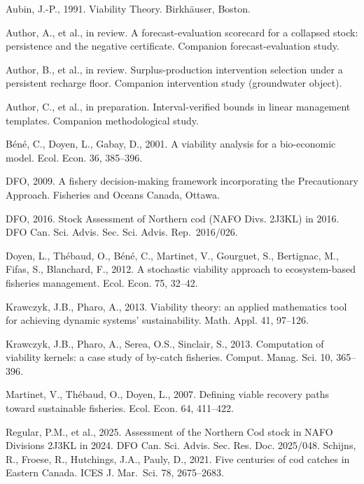 \documentclass[11pt]{article}
\begin{document}
Aubin, J.-P., 1991. Viability Theory. Birkh\"auser, Boston.

Author, A., et al., in review. A forecast-evaluation scorecard for a
collapsed stock: persistence and the negative certificate. Companion
forecast-evaluation study.

Author, B., et al., in review. Surplus-production intervention selection
under a persistent recharge floor. Companion intervention study
(groundwater object).

Author, C., et al., in preparation. Interval-verified bounds in linear
management templates. Companion methodological study.

B\'en\'e, C., Doyen, L., Gabay, D., 2001. A viability analysis for a
bio-economic model. Ecol. Econ. 36, 385--396.

DFO, 2009. A fishery decision-making framework incorporating the
Precautionary Approach. Fisheries and Oceans Canada, Ottawa.

DFO, 2016. Stock Assessment of Northern cod (NAFO Divs. 2J3KL) in 2016.
DFO Can. Sci. Advis. Sec. Sci. Advis. Rep.~2016/026.

Doyen, L., Th\'ebaud, O., B\'en\'e, C., Martinet, V., Gourguet, S., Bertignac,
M., Fifas, S., Blanchard, F., 2012. A stochastic viability approach to
ecosystem-based fisheries management. Ecol. Econ. 75, 32--42.

Krawczyk, J.B., Pharo, A., 2013. Viability theory: an applied
mathematics tool for achieving dynamic systems' sustainability. Math.
Appl. 41, 97--126.

Krawczyk, J.B., Pharo, A., Serea, O.S., Sinclair, S., 2013. Computation
of viability kernels: a case study of by-catch fisheries. Comput. Manag.
Sci. 10, 365--396.

Martinet, V., Th\'ebaud, O., Doyen, L., 2007. Defining viable recovery
paths toward sustainable fisheries. Ecol. Econ. 64, 411--422.

Regular, P.M., et al., 2025. Assessment of the Northern Cod stock in
NAFO Divisions 2J3KL in 2024. DFO Can. Sci. Advis. Sec. Res. Doc.
2025/048. Schijns, R., Froese, R., Hutchings, J.A., Pauly, D., 2021.
Five centuries of cod catches in Eastern Canada. ICES J. Mar.~Sci. 78,
2675--2683.
\end{document}
